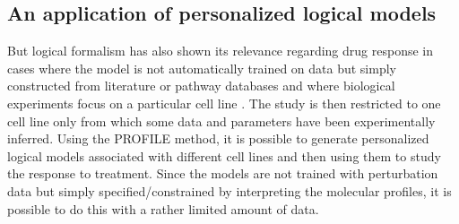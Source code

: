 \documentclass[a4paper,12pt,twoside,onecolumn,openright,final,oldfontcommands]{memoir}
\begin{document}
\subsection{An application of personalized logical
models}\label{an-application-of-personalized-logical-models}

But logical formalism has also shown its relevance regarding drug
response in cases where the model is not automatically trained on data
but simply constructed from literature or pathway databases and where
biological experiments focus on a particular cell line
\citep{flobak2015discovery}. The study is then restricted to one cell
line only from which some data and parameters have been experimentally
inferred. Using the PROFILE method, it is possible to generate
personalized logical models associated with different cell lines and
then using them to study the response to treatment. Since the models are
not trained with perturbation data but simply specified/constrained by
interpreting the molecular profiles, it is possible to do this with a
rather limited amount of data.
\end{document}
